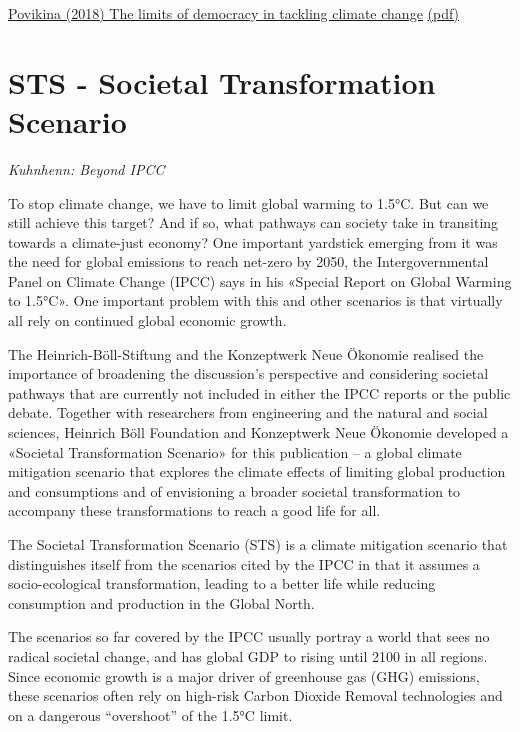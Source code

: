 \documentclass[
]{book}
\begin{document}
\href{https://www.researchgate.net/publication/323530041_The_limits_of_democracy_in_tackling_climate_change}{Povikina (2018) The limits of democracy in tackling climate change}
\href{pdf/Povitkina_2018_Limits_of_Democracy_Climate_Change.pdf}{(pdf)}

\hypertarget{sts---societal-transformation-scenario}{%
\section{STS - Societal Transformation Scenario}\label{sts---societal-transformation-scenario}}

\emph{Kuhnhenn: Beyond IPCC}

To stop climate change, we have to limit global warming to 1.5°C. But can we still achieve this target? And if so, what pathways can society take in transiting towards a climate-just economy? One important yardstick emerging from it was the need for global emissions to reach net-zero by 2050, the Intergovernmental Panel on Climate Change (IPCC) says in his «Special Report on Global Warming to 1.5°C». One important problem with this and other scenarios is that virtually all rely on continued global economic growth.

The Heinrich-Böll-Stiftung and the Konzeptwerk Neue Ökonomie realised the importance of broadening the discussion's perspective and considering societal pathways that are currently not included in either the IPCC reports or the public debate. Together with researchers from engineering and the natural and social sciences, Heinrich Böll Foundation and Konzeptwerk Neue Ökonomie developed a «Societal Transformation Scenario» for this publication -- a global climate mitigation scenario that explores the climate effects of limiting global production and consumptions and of envisioning a broader societal transformation to accompany these transformations to reach a good life for all.

The Societal Transformation Scenario (STS) is a climate mitigation scenario that distinguishes itself from the scenarios cited by the IPCC in that it assumes a socio-ecological transformation, leading to a better life while reducing consumption and production in the Global North.

The scenarios so far covered by the IPCC usually portray a world that sees no radical societal change, and has global GDP to rising until 2100 in all regions. Since economic growth is a major driver of greenhouse gas (GHG) emissions, these scenarios often rely on high-risk Carbon Dioxide Removal technologies and on a dangerous ``overshoot'' of the 1.5°C limit.
\end{document}
